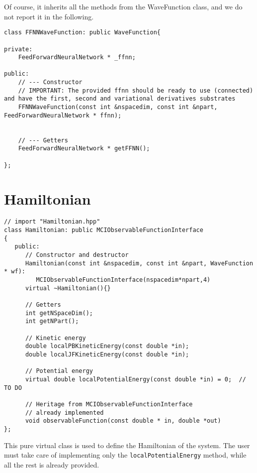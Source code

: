 \documentclass[11pt,a4paper,twoside]{article}
\begin{document}
Of course, it inherits all the methods from the WaveFunction class, and we do not report it in the following.

\begin{lstlisting}
class FFNNWaveFunction: public WaveFunction{

private:
    FeedForwardNeuralNetwork * _ffnn;

public:
    // --- Constructor
    // IMPORTANT: The provided ffnn should be ready to use (connected) and have the first, second and variational derivatives substrates
    FFNNWaveFunction(const int &nspacedim, const int &npart, FeedForwardNeuralNetwork * ffnn);


    // --- Getters
    FeedForwardNeuralNetwork * getFFNN();

};   
\end{lstlisting}









\section{Hamiltonian} %
\label{sec:hamiltonian}

\begin{lstlisting}
// import "Hamiltonian.hpp"
class Hamiltonian: public MCIObservableFunctionInterface
{
   public:
      // Constructor and destructor
      Hamiltonian(const int &nspacedim, const int &npart, WaveFunction * wf):
         MCIObservableFunctionInterface(nspacedim*npart,4)
      virtual ~Hamiltonian(){}

      // Getters
      int getNSpaceDim();
      int getNPart();

      // Kinetic energy
      double localPBKineticEnergy(const double *in);
      double localJFKineticEnergy(const double *in);

      // Potential energy
      virtual double localPotentialEnergy(const double *in) = 0;  // TO DO

      // Heritage from MCIObservableFunctionInterface
      // already implemented
      void observableFunction(const double * in, double *out)
};
\end{lstlisting}

This pure virtual class is used to define the Hamiltonian of the system.
The user must take care of implementing only the \verb+localPotentialEnergy+ method, while all the rest is already provided.
\end{document}

